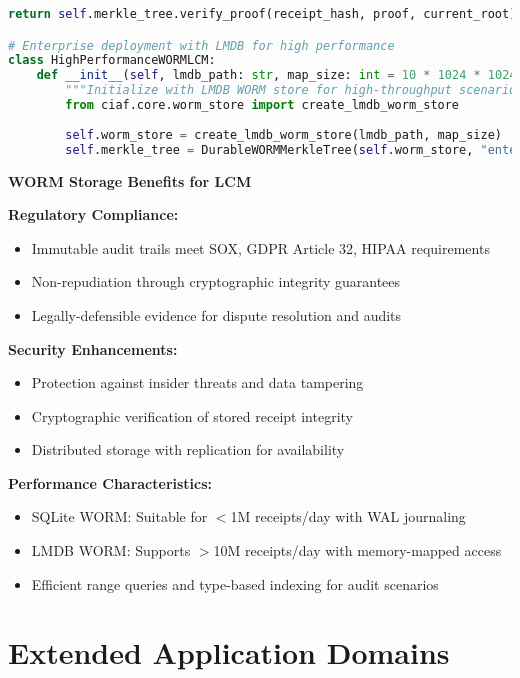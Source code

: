 \documentclass[12pt,a4paper]{article}
\begin{document}
\begin{lstlisting}[language=Python, caption=WORM-Enabled LCM Implementation]
        return self.merkle_tree.verify_proof(receipt_hash, proof, current_root)

# Enterprise deployment with LMDB for high performance
class HighPerformanceWORMLCM:
    def __init__(self, lmdb_path: str, map_size: int = 10 * 1024 * 1024 * 1024):
        """Initialize with LMDB WORM store for high-throughput scenarios"""
        from ciaf.core.worm_store import create_lmdb_worm_store
        
        self.worm_store = create_lmdb_worm_store(lmdb_path, map_size)
        self.merkle_tree = DurableWORMMerkleTree(self.worm_store, "enterprise_lcm")
\end{lstlisting}

\begin{infobox}
\textbf{WORM Storage Benefits for LCM}

\textbf{Regulatory Compliance:}
\begin{itemize}
\item Immutable audit trails meet SOX, GDPR Article 32, HIPAA requirements
\item Non-repudiation through cryptographic integrity guarantees
\item Legally-defensible evidence for dispute resolution and audits
\end{itemize}

\textbf{Security Enhancements:}
\begin{itemize}
\item Protection against insider threats and data tampering
\item Cryptographic verification of stored receipt integrity
\item Distributed storage with replication for availability
\end{itemize}

\textbf{Performance Characteristics:}
\begin{itemize}
\item SQLite WORM: Suitable for $<$1M receipts/day with WAL journaling
\item LMDB WORM: Supports $>$10M receipts/day with memory-mapped access
\item Efficient range queries and type-based indexing for audit scenarios
\end{itemize}
\end{infobox}

\section{Extended Application Domains}
\end{document}
